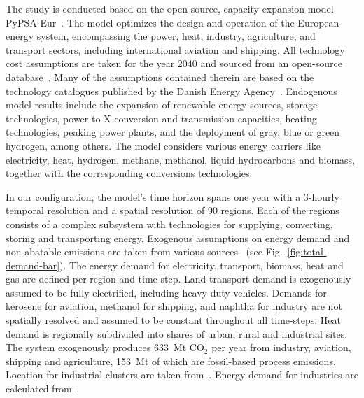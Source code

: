 \documentclass[twocolumn]{article}
\newcommand{\COtwo}{CO$_2$}
\begin{document}
The study is conducted based on the open-source, capacity expansion model PyPSA-Eur~\cite{horschPyPSAEurOpenOptimisation2018,brownSynergiesSectorCoupling2018,PyPSAEurSecSectorCoupledOpen2023}.
The model optimizes the design and operation of the European energy system, encompassing the power, heat, industry, agriculture, and transport sectors, including international aviation and shipping.
All technology cost assumptions are taken for the year 2040 and sourced from an open-source database~\cite{lisazeyenPyPSATechnologydataTechnology2023}.
Many of the assumptions contained therein are based on the technology catalogues published by the Danish Energy Agency~\cite{danishenergyagencyTechnologyDataGeneration2019,thedanishenergyagencyTechnologyDataCarbon2023}.
Endogenous model results include the expansion of renewable energy sources, storage technologies, power-to-X conversion and transmission capacities, heating technologies, peaking power plants, and the deployment of gray, blue or green hydrogen, among others.
The model considers various energy carriers like electricity, heat, hydrogen, methane, methanol, liquid hydrocarbons and biomass, together with the corresponding conversions technologies.



%
In our configuration, the model's time horizon spans one year with a 3-hourly temporal resolution and a spatial resolution of 90 regions. Each of the regions consists of a complex subsystem with technologies for supplying, converting, storing and transporting energy. Exogenous assumptions on energy demand and non-abatable emissions are taken from various sources~\cite{piamanzGeoreferencedIndustrialSites2018,muehlenpfordtTimeSeries2019,mantzosJRCIDEES20152018,NationalEmissionsReported2023,EurostatCompleteEnergyBalance,uwekrienDemandlib2023} (see Fig.~\ref{fig:total-demand-bar}). The energy demand for electricity, transport, biomass, heat and gas are defined per region and time-step.
Land transport demand is exogenously assumed to be fully electrified, including heavy-duty vehicles.
Demands for kerosene for aviation, methanol for shipping, and naphtha for industry are not spatially resolved and assumed to be constant throughout all time-steps.
Heat demand is regionally subdivided into shares of urban, rural and industrial sites.
The system exogenously produces 633~Mt \COtwo{} per year from industry, aviation, shipping and agriculture, 153~Mt of which are fossil-based process emissions.
Location for industrial clusters are taken from~\cite{hotmaps_industrial_db}. Energy demand for industries are calculated from~\cite{mantzosJRCIDEES20152018}.
\end{document}
